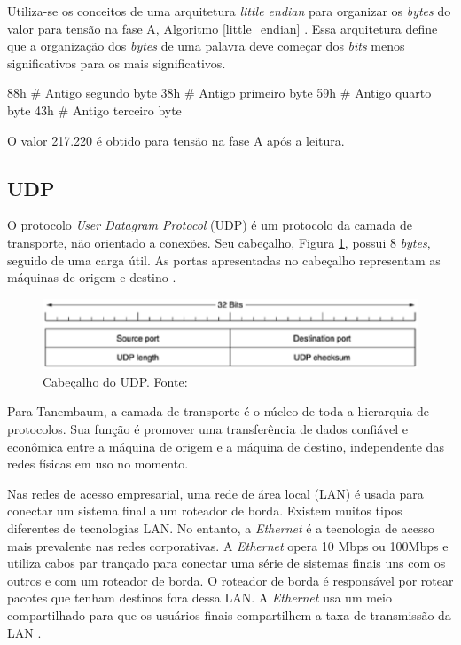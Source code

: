     Utiliza-se os conceitos de uma arquitetura \textit{little endian} \cite{tanenbaum_1998} para organizar os \textit{bytes} do valor para tensão na fase A, Algoritmo \ref{little_endian} . Essa arquitetura define que a organização dos \textit{bytes} de uma palavra deve começar dos \textit{bits} menos significativos para os mais significativos.

    \begin{python}[caption={Organização do valor para tensão na fase A, utilizando uma arquitetura \textit{little endian}.}, captionpos=b, label={little_endian}]
    88h # Antigo segundo byte
    38h # Antigo primeiro byte
    59h # Antigo quarto byte
    43h # Antigo terceiro byte
    \end{python}

    O valor 217.220 é obtido para tensão na fase A após a leitura.

    \subsection{UDP}
    O protocolo \textit{User Datagram Protocol} (UDP) é um protocolo da camada de transporte, não orientado a conexões. Seu cabeçalho, Figura \ref{udp_header}, possui 8 \textit{bytes}, seguido de uma carga útil. As portas apresentadas no cabeçalho representam as máquinas de origem e destino \cite{tanenbaum_2002}.

    \begin{figure}[!htpb]
        \centering
        \includegraphics[keepaspectratio=true,scale=0.8]{figuras/udp_header.eps}
        \caption{Cabeçalho do UDP. Fonte: \cite{tanenbaum_2002}}
        \label{udp_header}
    \end{figure}

    Para Tanembaum, a camada de transporte é o núcleo de toda a hierarquia de protocolos. Sua função é promover uma transferência de dados confiável e econômica entre a máquina de origem e a máquina de destino, independente das redes físicas em uso no momento.

    Nas redes de acesso empresarial, uma rede de área local (LAN) é usada para conectar um sistema final a um roteador de borda. Existem muitos tipos diferentes de tecnologias LAN. No entanto, a \textit{Ethernet} é a tecnologia de acesso mais prevalente nas redes corporativas. A \textit{Ethernet} opera 10 Mbps ou 100Mbps e utiliza cabos par trançado para conectar uma série de sistemas finais uns com os outros e com um roteador de borda. O roteador de borda é responsável por rotear pacotes que tenham destinos fora dessa LAN. A \textit{Ethernet} usa um meio compartilhado para que os usuários finais compartilhem a taxa de transmissão da LAN \cite{kurose_2002}.

